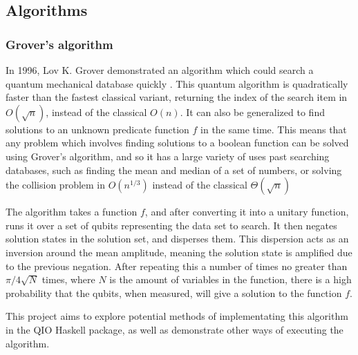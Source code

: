\documentclass[a4paper,10pt, titlepage, twoside]{article}
\begin{document}
\subsection{Algorithms}
\subsubsection{Grover's algorithm}
In 1996, Lov K. Grover demonstrated an algorithm which could search a quantum mechanical database quickly \cite{grover}. This quantum algorithm is quadratically faster than the fastest classical variant, returning the index of the search item in $O(\sqrt{n})$, instead of the classical $O(n)$. It can also be generalized to find solutions to an unknown predicate function $f$ in the same time. This means that any problem which involves finding solutions to a boolean function can be solved using Grover's algorithm, and so it has a large variety of uses past searching databases, such as finding the mean and median of a set of numbers, or solving the collision problem in $O(n^{1/3})$\cite{collision} instead of the classical $\Theta (\sqrt n)$\par
The algorithm takes a function $f$, and after converting it into a unitary function, runs it over a set of qubits representing the data set to search. It then negates solution states in the solution set, and disperses them. This dispersion acts as an inversion around the mean amplitude, meaning the solution state is amplified due to the previous negation. After repeating this a number of times no greater than $\pi/4\sqrt{N}$ times, where $N$ is the amount of variables in the function, there is a high probability that the qubits, when measured, will give a solution to the function $f$.\par
This project aims to explore potential methods of implementating this algorithm in the QIO Haskell package, as well as demonstrate other ways of executing the algorithm.
\end{document}
